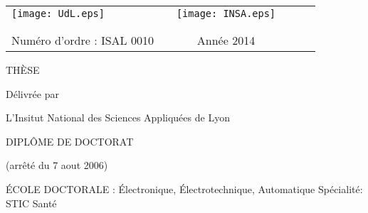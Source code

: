 \pagestyle{empty}
\thispagestyle{empty} \noindent 


\newenvironment{changemargin}[2]{\begin{list}{}{%
\setlength{\topsep}{0pt}%
\setlength{\leftmargin}{0pt}%
\setlength{\rightmargin}{0pt}%
\setlength{\listparindent}{\parindent}%
\setlength{\itemindent}{\parindent}%
\setlength{\parsep}{0pt plus 1pt}%
\addtolength{\leftmargin}{#1}%
\addtolength{\rightmargin}{#2}%
}\item }{\end{list}}

\begin{changemargin}{-1.7cm}{0 cm}

\begin{tabular}{l m{5cm} c m{5cm} r m{5cm}}
\texttt{[image: UdL.eps]} &  & \texttt{[image: INSA.eps]} \\
  &   &  \\
  &   &  \\
\small Num\'ero d'ordre : ISAL 0010 &   & \small Ann\'ee 2014
\end{tabular}

\vspace{0.6cm}

\begin{center}
{\Large TH\`ESE}

\vspace{0.15cm}

{D\'{e}livr\'{e}e par}

\vspace{0.15cm}

{\Large L'Insitut National des Sciences Appliqu\'ees de Lyon}

\vspace{0.5cm}

{\Large DIPL\^{O}ME DE DOCTORAT}

\vspace{0.15cm}

{(arr\^{e}t\'{e} du 7 aout 2006)}

\vspace{0.5cm}

{\Large \'ECOLE DOCTORALE : \'{E}lectronique, \'{E}lectrotechnique,
Automatique
Sp\'{e}cialit\'e: STIC Sant\'{e}
}

\vspace{0.5cm}


\end{center}
\end{changemargin}
